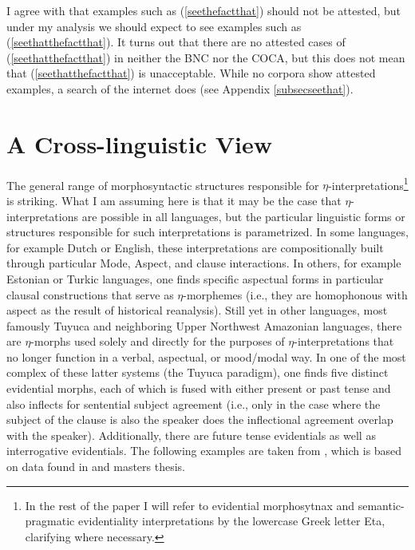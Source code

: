 \documentclass{article}
\begin{document}
I agree with \cite{vangelderen05cpsplit} that examples such as (\ref{seethefactthat}) should not be attested, but under my analysis we should expect to see examples such as (\ref{seethatthefactthat}). It turns out that there are no attested cases of (\ref{seethatthefactthat}) in neither the BNC nor the COCA, but this does not mean that (\ref{seethatthefactthat}) is unacceptable. While no corpora show attested examples, a search of the internet does (see Appendix \ref{subsecseethat}). 
 


\section{A Cross-linguistic View}

The general range of morphosyntactic structures responsible for $\eta$-interpretations\footnote{In the rest of the paper I will refer to evidential morphosytnax and semantic-pragmatic evidentiality interpretations by the lowercase Greek letter Eta, clarifying where necessary.} is striking. What I am assuming here is that it may be the case that $\eta$-interpretations are possible in {\sc all} languages, but the particular linguistic forms or structures responsible for such interpretations is parametrized. In some languages, for example Dutch or English, these interpretations are compositionally built through particular Mode, Aspect, and clause interactions. In others, for example Estonian or Turkic languages, one finds specific aspectual forms in particular clausal constructions that serve as $\eta$-morphemes (i.e., they are homophonous with aspect as the result of historical reanalysis). Still yet in other languages, most famously Tuyuca and neighboring Upper Northwest Amazonian languages, there are $\eta$-morphs used solely and directly for the purposes of $\eta$-interpretations that no longer function in a verbal, aspectual, or mood/modal way. In one of the most complex of these latter systems (the Tuyuca paradigm), one finds five distinct evidential morphs, each of which is fused with either present or past tense and also inflects for sentential subject agreement (i.e., only in the case where the subject of the clause is also the speaker does the inflectional agreement overlap with the speaker). Additionally, there are future tense evidentials as well as interrogative evidentials. The following examples are taken from \cite{bowles09tuyucadata}, which is based on data found in \cite{barnes84evd, barnes94negation, barnes96autosegments} and  masters thesis.
\end{document}
